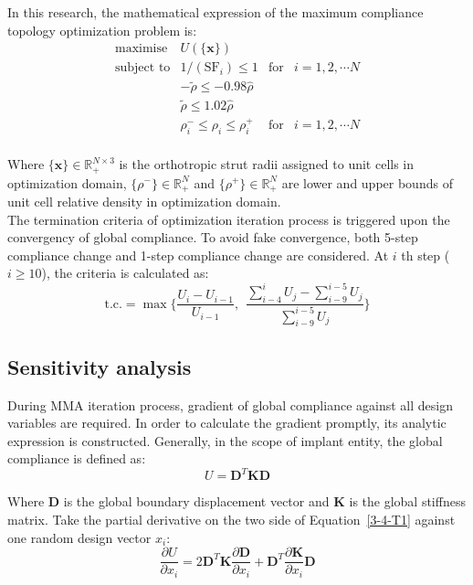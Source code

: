 \documentclass[12pt]{extbook}
\begin{document}
In this research, the mathematical expression of the maximum compliance topology optimization problem is:
\begin{equation}
\begin{array}{llll}
\text{maximise} & U(\{\bm{x}\})\\
\text{subject to} & 1/(\text{SF}_i) \leq 1 & \text{for} & i = 1, 2,\cdots N\\
& -\tilde{\rho} \leq -0.98\hat{\rho}\\
& \tilde{\rho} \leq 1.02\hat{\rho}\\
& \rho_i^- \leq \rho_{i} \leq \rho_i^+ & \text{for} & i = 1, 2,\cdots N\\
\end{array}
\label{3-4-2}
\end{equation}

Where $\{\bm{x}\}\in\mathbb{R}_+^{N\times3}$ is the orthotropic strut radii assigned to unit cells in optimization domain, $\{\rho^-\}\in\mathbb{R}_+^N$ and $\{\rho^+\}\in\mathbb{R}_+^N$ are lower and upper bounds of unit cell relative density in optimization domain.\\

The termination criteria of optimization iteration process is triggered upon the convergency of global compliance. To avoid fake convergence, both 5-step compliance change and 1-step compliance change are considered. At $i$ th step ($i \geq 10$), the criteria is calculated as:
\begin{equation}
\text{t.c.} = \max{\{ \frac{U_i-U_{i-1}}{U_{i-1}},~~ \frac{\sum_{i-4}^{i} U_j-\sum_{i-9}^{i-5}U_j}{\sum_{i-9}^{i-5}U_j} \}}
\label{3-4-7}
\end{equation}

\subsection{Sensitivity analysis}

During MMA iteration process, gradient of global compliance against all design variables are required. In order to calculate the gradient promptly, its analytic expression is constructed. Generally, in the scope of implant entity, the global compliance is defined as:
\begin{equation}
U = \bm{D}^T\bm{K}\bm{D}
\label{3-4-T1}
\end{equation}

Where $\bm{D}$ is the global boundary displacement vector and $\bm{K}$ is the global stiffness matrix. Take the partial derivative on the two side of Equation~\ref{3-4-T1} against one random design vector $x_i$:
\begin{equation}
\frac{\partial U}{\partial x_i} = 2\bm{D}^T\bm{K}\frac{\partial \bm{D}}{\partial x_i} + \bm{D}^T\frac{\partial \bm{K}}{\partial x_i}\bm{D}
\label{3-4-T2}
\end{equation}
\end{document}
